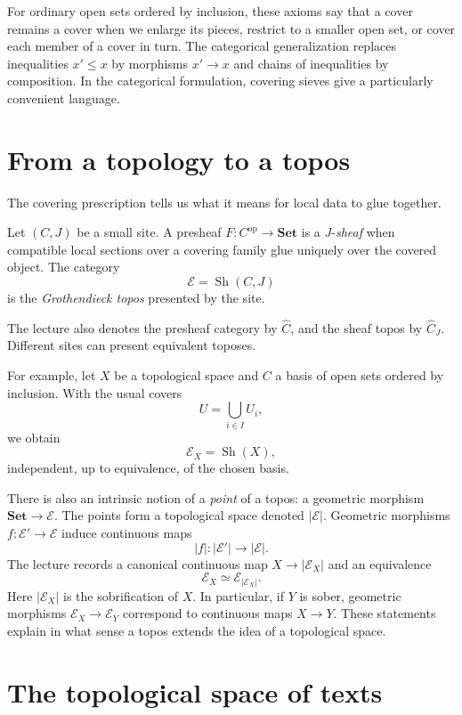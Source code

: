 For ordinary open sets ordered by inclusion, these axioms say that a cover remains a cover when we enlarge its pieces, restrict to a smaller open set, or cover each member of a cover in turn. The categorical generalization replaces inequalities \(x'\leq x\) by morphisms \(x'\to x\) and chains of inequalities by composition. In the categorical formulation, covering sieves give a particularly convenient language.

\section{From a topology to a topos}

The covering prescription tells us what it means for local data to glue together.

\begin{definition}
Let \((C,J)\) be a small site. A presheaf \(F:C^{\mathrm{op}}\to\mathbf{Set}\) is a \(J\)-\emph{sheaf} when compatible local sections over a covering family glue uniquely over the covered object. The category
\[
 \mathcal E=\operatorname{Sh}(C,J)
\]
is the \emph{Grothendieck topos} presented by the site.
\end{definition}

The lecture also denotes the presheaf category by \(\widehat C\), and the sheaf topos by \(\widehat C_J\). Different sites can present equivalent toposes.

For example, let \(X\) be a topological space and \(C\) a basis of open sets ordered by inclusion. With the usual covers
\[
 U=\bigcup_{i\in I}U_i,
\]
we obtain
\[
 \mathcal E_X=\operatorname{Sh}(X),
\]
independent, up to equivalence, of the chosen basis.

There is also an intrinsic notion of a \emph{point} of a topos: a geometric morphism \(\mathbf{Set}\to\mathcal E\). The points form a topological space denoted \(|\mathcal E|\). Geometric morphisms \(f:\mathcal E'\to\mathcal E\) induce continuous maps
\[
 |f|:|\mathcal E'|\longrightarrow|\mathcal E|.
\]
The lecture records a canonical continuous map \(X\to|\mathcal E_X|\) and an equivalence
\[
 \mathcal E_X\simeq\mathcal E_{|\mathcal E_X|}.
\]
Here \(|\mathcal E_X|\) is the sobrification of \(X\). In particular, if \(Y\) is sober, geometric morphisms \(\mathcal E_X\to\mathcal E_Y\) correspond to continuous maps \(X\to Y\). These statements explain in what sense a topos extends the idea of a topological space.

\section{The topological space of texts}

